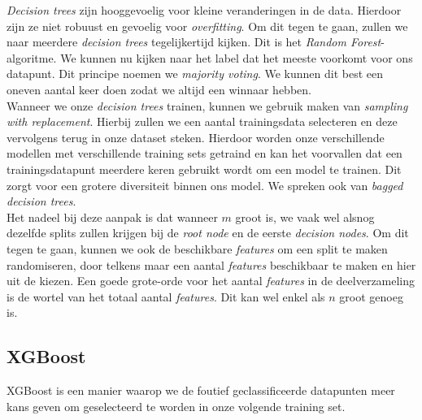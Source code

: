 \textit{Decision trees} zijn hooggevoelig voor kleine veranderingen in de data. Hierdoor zijn ze niet robuust en gevoelig voor \textit{overfitting}. Om dit tegen te gaan, zullen we naar meerdere \textit{decision trees} tegelijkertijd kijken. Dit is het \textit{Random Forest}-algoritme. We kunnen nu kijken naar het label dat het meeste voorkomt voor ons datapunt. Dit principe noemen we \textit{majority voting}. We kunnen dit best een oneven aantal keer doen zodat we altijd een winnaar hebben. \\
\newline
Wanneer we onze \textit{decision trees} trainen, kunnen we gebruik maken van \textit{sampling with replacement}. Hierbij zullen we een aantal trainingsdata selecteren en deze vervolgens terug in onze dataset steken. Hierdoor worden onze verschillende modellen met verschillende training sets getraind en kan het voorvallen dat een trainingsdatapunt meerdere keren gebruikt wordt om een model te trainen. Dit zorgt voor een grotere diversiteit binnen ons model. We spreken ook van \textit{bagged decision trees}. \\
\newline
Het nadeel bij deze aanpak is dat wanneer $m$ groot is, we vaak wel alsnog dezelfde splits zullen krijgen bij de \textit{root node} en de eerste \textit{decision nodes}. Om dit tegen te gaan, kunnen we ook de beschikbare \textit{features} om een split te maken randomiseren, door telkens maar een aantal \textit{features} beschikbaar te maken en hier uit de kiezen. Een goede grote-orde voor het aantal \textit{features} in de deelverzameling is de wortel van het totaal aantal \textit{features}. Dit kan wel enkel als $n$ groot genoeg is.

\subsection{XGBoost}

XGBoost is een manier waarop we de foutief geclassificeerde datapunten meer kans geven om geselecteerd te worden in onze volgende training set. 
